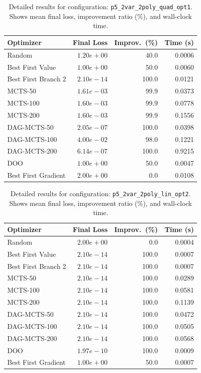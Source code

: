 \begin{table}[H]
\centering
\caption{Detailed results for configuration: \texttt{p5\_2var\_2poly\_quad\_opt1}. Shows mean final loss, improvement ratio (\%), and wall-clock time.}
\label{tab:abssum-detail-30}
\begin{tabular}{lrrr}
\toprule
Optimizer & Final Loss & Improv.~(\%) & Time (s) \\
\midrule
Random & $1.20e+00$ & 40.0 & 0.0006 \\
\hline
Best First Value & $1.00e+00$ & 50.0 & 0.0060 \\
\hline
Best First Branch 2 & \textbf{$2.10e-14$} & 100.0 & 0.0121 \\
\hline
MCTS-50 & $1.61e-03$ & 99.9 & 0.0373 \\
\hline
MCTS-100 & $1.60e-03$ & 99.9 & 0.0778 \\
\hline
MCTS-200 & $1.60e-03$ & 99.9 & 0.1556 \\
\hline
DAG-MCTS-50 & $2.05e-07$ & 100.0 & 0.0398 \\
\hline
DAG-MCTS-100 & $4.00e-02$ & 98.0 & 0.1221 \\
\hline
DAG-MCTS-200 & $6.14e-07$ & 100.0 & 0.9215 \\
\hline
DOO & $1.00e+00$ & 50.0 & 0.0047 \\
\hline
Best First Gradient & $2.00e+00$ & 0.0 & 0.0108 \\
\bottomrule
\end{tabular}
\end{table}

\begin{table}[H]
\centering
\caption{Detailed results for configuration: \texttt{p5\_2var\_2poly\_lin\_opt2}. Shows mean final loss, improvement ratio (\%), and wall-clock time.}
\label{tab:abssum-detail-31}
\begin{tabular}{lrrr}
\toprule
Optimizer & Final Loss & Improv.~(\%) & Time (s) \\
\midrule
Random & $2.00e+00$ & 0.0 & 0.0004 \\
\hline
Best First Value & \textbf{$2.10e-14$} & 100.0 & 0.0007 \\
\hline
Best First Branch 2 & \textbf{$2.10e-14$} & 100.0 & 0.0007 \\
\hline
MCTS-50 & \textbf{$2.10e-14$} & 100.0 & 0.0289 \\
\hline
MCTS-100 & \textbf{$2.10e-14$} & 100.0 & 0.0581 \\
\hline
MCTS-200 & \textbf{$2.10e-14$} & 100.0 & 0.1139 \\
\hline
DAG-MCTS-50 & \textbf{$2.10e-14$} & 100.0 & 0.0472 \\
\hline
DAG-MCTS-100 & \textbf{$2.10e-14$} & 100.0 & 0.0505 \\
\hline
DAG-MCTS-200 & \textbf{$2.10e-14$} & 100.0 & 0.0568 \\
\hline
DOO & $1.97e-10$ & 100.0 & 0.0009 \\
\hline
Best First Gradient & $1.00e+00$ & 50.0 & 0.0007 \\
\bottomrule
\end{tabular}
\end{table}

